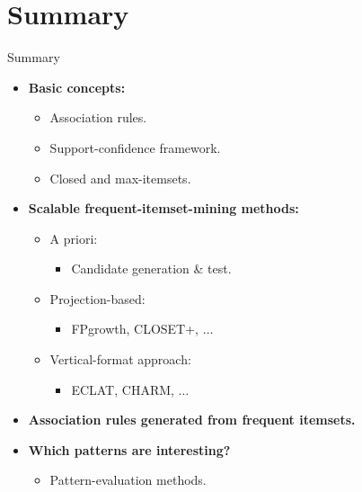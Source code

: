 \section{Summary}

\begin{frame}{Summary}
	\begin{itemize}
		\item \textbf{Basic concepts:}
		      \begin{itemize}
			      \item Association rules.
			      \item Support-confidence framework.
			      \item Closed and max-itemsets.
		      \end{itemize}
		\item \textbf{Scalable frequent-itemset-mining methods:}
		      \begin{itemize}
			      \item A priori:
			            \begin{itemize}
				            \item Candidate generation \& test.
			            \end{itemize}
			      \item Projection-based:
			            \begin{itemize}
				            \item FPgrowth, CLOSET+, $\ldots$
			            \end{itemize}
			      \item Vertical-format approach:
			            \begin{itemize}
				            \item ECLAT, CHARM, $\ldots$
			            \end{itemize}
		      \end{itemize}
		\item \textbf{Association rules generated from frequent
			      itemsets.}
		\item \textbf{Which patterns are interesting?}
		      \begin{itemize}
			      \item Pattern-evaluation methods.
		      \end{itemize}
	\end{itemize}
\end{frame}
